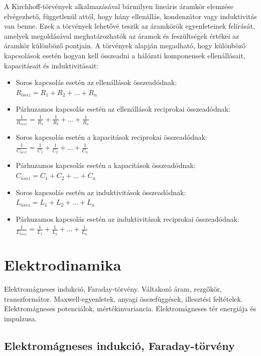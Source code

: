 \documentclass[a4paper,12pt]{article}
\begin{document}
A Kirchhoff-törvények alkalmazásával bármilyen lineáris áramkör elemzése elvégezhető, függetlenül attól, hogy hány ellenállás, kondenzátor vagy induktivitás van benne. Ezek a törvények lehetővé teszik az áramkörök egyenleteinek felírását, amelyek megoldásával meghatározhatók az áramok és feszültségek értékei az áramkör különböző pontjain.
A törvények alapján megadható, hogy különböző kapcsolások esetén hogyan kell összeadni a hálózati komponensek ellenállásait, kapacitásait és induktivitásait:
\begin{itemize}
    \item Soros kapcsolás esetén az ellenállások összeadódnak: $R_{össz} = R_1 + R_2 + \ldots + R_n$
    \item Párhuzamos kapcsolás esetén az ellenállások reciprokai összeadódnak: $\frac{1}{R_{össz}} = \frac{1}{R_1} + \frac{1}{R_2} + \ldots + \frac{1}{R_n}$
    \item Soros kapcsolás esetén a kapacitások reciprokai összeadódnak: $\frac{1}{C_{össz}} = \frac{1}{C_1} + \frac{1}{C_2} + \ldots + \frac{1}{C_n}$
    \item Párhuzamos kapcsolás esetén a kapacitások összeadódnak: $C_{össz} = C_1 + C_2 + \ldots + C_n$
    \item Soros kapcsolás esetén az induktivitások összeadódnak: $L_{össz} = L_1 + L_2 + \ldots + L_n$
    \item Párhuzamos kapcsolás esetén az induktivitások reciprokai összeadódnak: $\frac{1}{L_{össz}} = \frac{1}{L_1} + \frac{1}{L_2} + \ldots + \frac{1}{L_n}$
\end{itemize}

\newpage
\section{Elektrodinamika \cite{electro_intro}}
Elektromágneses indukció, Faraday-törvény. Váltakozó áram, rezgőkör, transzformátor. Maxwell-egyenletek, anyagi összefüggések, illesztési feltételek.
Elektromágneses potenciálok, mértékinvariancia. Elektromágneses tér energiája és impulzusa.

\subsection{Elektromágneses indukció, Faraday-törvény}
\end{document}
